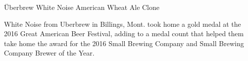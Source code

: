 \begin{recipie}{Überbrew White Noise American Wheat Ale Clone}

\begin{aboutblock}
White Noise from Uberbrew in Billings, Mont. took home a gold medal at the 2016
Great American Beer Festival, adding to a medal count that helped them take home
the award for the 2016 Small Brewing Company and Small Brewing Company Brewer of
the Year. \sourceaha
\end{aboutblock}


\begin{methodandtiming}
 
\begin{mashsteps}
\end{mashsteps}

\end{methodandtiming}

\pagebreak

\begin{ingredientsblock}

\begin{malts}
\end{malts}

\begin{hops}
\end{hops}


\end{ingredientsblock}

\end{recipie}